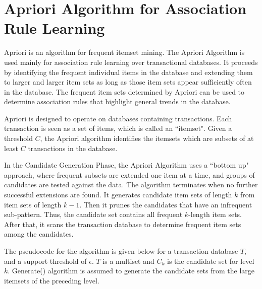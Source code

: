 \section{Apriori Algorithm for Association Rule Learning}
Apriori is an algorithm for frequent itemset mining. The Apriori Algorithm is used mainly for association rule learning over transactional databases. It proceeds by identifying the frequent individual items in the database and extending them to larger and larger item sets as long as those item sets appear sufficiently often in the database. The frequent item sets determined by Apriori can be used to determine association rules that highlight general trends in the database.

Apriori is designed to operate on databases containing transactions. Each transaction is seen as a set of items, which is called an ``itemset". Given a threshold \begin{math}C\end{math}, the Apriori algorithm identifies the itemsets which are subsets of at least \begin{math}C\end{math} transactions in the database. 

In the Candidate Generation Phase, the Apriori Algorithm uses a ``bottom up" approach, where frequent subsets are extended one item at a time, and groups of candidates are tested against the data. The algorithm terminates when no further successful extensions are found.
It generates candidate item sets of length \begin{math}k\end{math} from item sets of length \begin{math}k-1\end{math}.  Then it prunes the candidates that have an infrequent sub-pattern. Thus, the candidate set contains all frequent \begin{math}k\end{math}-length item sets. After that, it scans the transaction database to determine frequent item sets among the candidates.  

The pseudocode for the algorithm is given below for a transaction database \begin{math}T\end{math}, and a support threshold of \begin{math}\epsilon\end{math}. \begin{math}T\end{math} is a multiset and \begin{math}C_k\end{math} is the candidate set for level \begin{math}k\end{math}.  Generate() algorithm is assumed to generate the candidate sets from the large itemsets of the preceding level.

